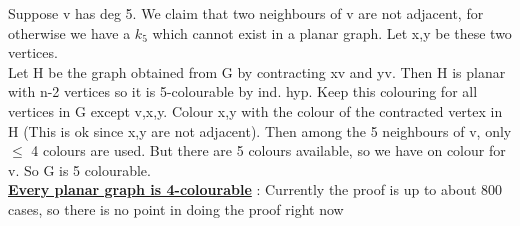 \documentclass[12pt]{article}
\newcommand{\myt}[1]{\textbf{\underline{#1}}}
\begin{document}
	Suppose v has deg 5. We claim that two neighbours of v are not adjacent, for otherwise we have a $k_5$ which cannot exist in a planar graph. Let x,y be these two vertices.\\
	Let H be the graph obtained from G by contracting xv and yv. Then H is planar with n-2 vertices so it is 5-colourable by ind. hyp. Keep this colouring for all vertices in G except v,x,y. Colour x,y with the colour of the contracted vertex in H (This is ok since x,y are not adjacent). Then among the 5 neighbours of v, only $\leq$ 4 colours are used. But there are 5 colours available, so we have on colour for v. So G is 5 colourable.\\
	
	\myt{Every planar graph is 4-colourable} : Currently the proof is up to about 800 cases, so there is no point in doing the proof right now\\
	
	
\end{document}
